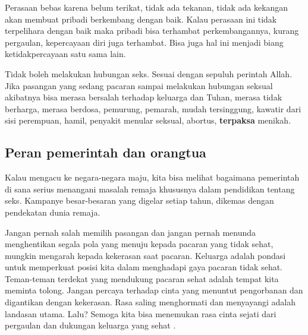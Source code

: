 \documentclass[a4paper,11pt,openany]{article}
\begin{document}
Perasaan bebas karena belum terikat, tidak ada tekanan, tidak ada kekangan akan membuat pribadi berkembang dengan baik. Kalau perasaan ini
tidak terpelihara dengan baik maka
pribadi bisa terhambat perkembangannya, 
kurang pergaulan, kepercayaan diri juga terhambat. 
Bisa juga hal ini menjadi biang ketidakpercayaan satu sama lain.

Tidak boleh melakukan hubungan seks. Sesuai dengan sepuluh perintah Allah. Jika pasangan yang sedang pacaran sampai melakukan hubungan seksual akibatnya bisa
merasa bersalah terhadap keluarga dan Tuhan,
merasa tidak berharga,
merasa berdosa,
pemurung, pemarah, mudah tersinggung,
kawatir dari sisi perempuan,
hamil,
penyakit menular seksual, abortus,
\textbf{terpaksa} menikah.

\subsection*{Peran pemerintah dan orangtua}
Kalau mengacu ke negara-negara maju, kita bisa melihat bagaimana pemerintah di sana serius menangani masalah remaja khususnya dalam pendidikan tentang seks. Kampanye besar-besaran yang digelar setiap tahun, dikemas dengan pendekatan dunia remaja.

Jangan pernah salah memilih pasangan dan jangan pernah menunda menghentikan segala pola yang menuju kepada pacaran yang tidak sehat, mungkin mengarah kepada kekerasan saat pacaran. Keluarga adalah pondasi untuk memperkuat posisi kita dalam menghadapi gaya pacaran tidak sehat. Teman-teman terdekat yang mendukung pacaran sehat adalah tempat kita meminta tolong. Jangan percaya terhadap cinta yang menuntut pengorbanan dan digantikan dengan kekerasan. Rasa saling menghormati dan menyayangi adalah landasan utama. Lalu? Semoga kita bisa menemukan rasa cinta sejati dari pergaulan dan dukungan keluarga yang sehat \cite{sony2009}.
\end{document}
